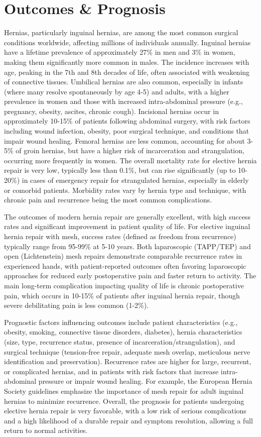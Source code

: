 \section*{Outcomes \& Prognosis}
Hernias, particularly inguinal hernias, are among the most common surgical conditions worldwide, affecting millions of individuals annually. Inguinal hernias have a lifetime prevalence of approximately 27\% in men and 3\% in women, making them significantly more common in males. The incidence increases with age, peaking in the 7th and 8th decades of life, often associated with weakening of connective tissues. Umbilical hernias are also common, especially in infants (where many resolve spontaneously by age 4-5) and adults, with a higher prevalence in women and those with increased intra-abdominal pressure (e.g., pregnancy, obesity, ascites, chronic cough). Incisional hernias occur in approximately 10-15\% of patients following abdominal surgery, with risk factors including wound infection, obesity, poor surgical technique, and conditions that impair wound healing. Femoral hernias are less common, accounting for about 3-5\% of groin hernias, but have a higher risk of incarceration and strangulation, occurring more frequently in women. The overall mortality rate for elective hernia repair is very low, typically less than 0.1\%, but can rise significantly (up to 10-20\%) in cases of emergency repair for strangulated hernias, especially in elderly or comorbid patients. Morbidity rates vary by hernia type and technique, with chronic pain and recurrence being the most common complications.

The outcomes of modern hernia repair are generally excellent, with high success rates and significant improvement in patient quality of life. For elective inguinal hernia repair with mesh, success rates (defined as freedom from recurrence) typically range from 95-99\% at 5-10 years. Both laparoscopic (TAPP/TEP) and open (Lichtenstein) mesh repairs demonstrate comparable recurrence rates in experienced hands, with patient-reported outcomes often favoring laparoscopic approaches for reduced early postoperative pain and faster return to activity. The main long-term complication impacting quality of life is chronic postoperative pain, which occurs in 10-15\% of patients after inguinal hernia repair, though severe debilitating pain is less common (1-2\%).

Prognostic factors influencing outcomes include patient characteristics (e.g., obesity, smoking, connective tissue disorders, diabetes), hernia characteristics (size, type, recurrence status, presence of incarceration/strangulation), and surgical technique (tension-free repair, adequate mesh overlap, meticulous nerve identification and preservation). Recurrence rates are higher for large, recurrent, or complicated hernias, and in patients with risk factors that increase intra-abdominal pressure or impair wound healing. For example, the European Hernia Society guidelines emphasize the importance of mesh repair for adult inguinal hernias to minimize recurrence. Overall, the prognosis for patients undergoing elective hernia repair is very favorable, with a low risk of serious complications and a high likelihood of a durable repair and symptom resolution, allowing a full return to normal activities.

